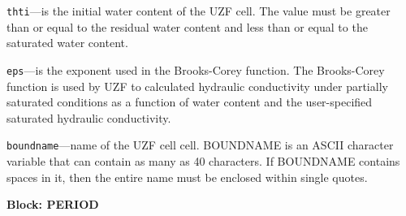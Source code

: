 \begin{description}
\item \texttt{thti}---is the initial water content of the UZF cell.  The value must be greater than or equal to the residual water content and less than or equal to the saturated water content.

\item \texttt{eps}---is the exponent used in the Brooks-Corey function.  The Brooks-Corey function is used by UZF to calculated hydraulic conductivity under partially saturated conditions as a function of water content and the user-specified saturated hydraulic conductivity.

\item \texttt{boundname}---name of the UZF cell cell.  BOUNDNAME is an ASCII character variable that can contain as many as 40 characters.  If BOUNDNAME contains spaces in it, then the entire name must be enclosed within single quotes.

\end{description}
\item \textbf{Block: PERIOD}

